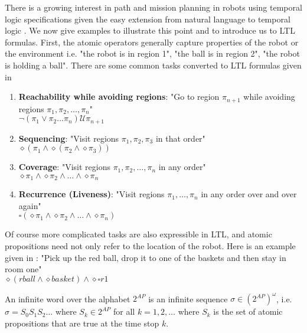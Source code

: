 There is a growing interest in path and mission planning in robots using temporal logic specifications given the easy extension from natural language to temporal logic \cite{kress07}. We now give examples to illustrate this point and to introduce us to LTL formulas. First, the atomic operators generally capture properties of the robot or the environment i.e. "the robot is in region 1", "the ball is in region 2", "the robot is holding a ball". There are some common tasks converted to LTL formulas given in \citep{fainekos09} 
\begin{enumerate}
    \item \textbf{Reachability while avoiding regions}: "Go to region $\pi_{n+1}$ while avoiding regions $\pi_1, \pi_2, \dots, \pi_n$" \\ $\neg(\pi_1 \lor \pi_2 \dots \pi_n) \mathcal{U} \pi_{n+1}$ 
    \item \textbf{Sequencing}: "Visit regions $\pi_1, \pi_2, \pi_3$ in that order"\\ 
    $\diamond (\pi_1 \land \diamond(\pi_2 \land \diamond \pi_3))$ 
    \item \textbf{Coverage}: "Visit regions $\pi_1, \pi_2, \dots, \pi_n$ in any order"\\ $\diamond \pi_1 \land \diamond \pi_2 \land \dots \land \diamond \pi_n$
    \item \textbf{Recurrence (Liveness)}: "Visit regions $\pi_1, \dots, \pi_n$ in any order over and over again"\\ $\square(\diamond \pi_1 \land \diamond \pi_2 \land \dots \land \diamond \pi_n)$      
\end{enumerate}
Of course more complicated tasks are also expressible in LTL, and atomic propositions need not only refer to the location of the robot. Here is an example given in  \cite{guo15}: "Pick up the red ball, drop it to one of the baskets and then stay in room one" \\
$\diamond(rball \land \diamond basket) \land \diamond \square r1$ 

An infinite word over the alphabet $2^{AP}$ is an infinite sequence $\sigma \in (2^{AP})^\omega$, i.e.\ $\sigma = S_0 S_1 S_2 \dots$ where $S_k \in 2^{AP}$ for all $k=1,2,\dots$ where $S_k$ is the set of atomic propositions that are true at the time stop $k$. 

